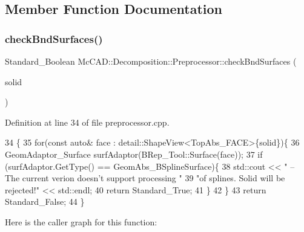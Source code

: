 \subsection{Member Function Documentation}
\mbox{\label{classMcCAD_1_1Decomposition_1_1Preprocessor_a1a473424ccfb217e9bce1730e1f8a0da}} 
\subsubsection{\texorpdfstring{check\+Bnd\+Surfaces()}{checkBndSurfaces()}\hspace{0.1cm}{\footnotesize\ttfamily [1/2]}}
{\footnotesize\ttfamily Standard\+\_\+\+Boolean Mc\+C\+A\+D\+::\+Decomposition\+::\+Preprocessor\+::check\+Bnd\+Surfaces (\begin{DoxyParamCaption}\item[{const Topo\+D\+S\+\_\+\+Solid \&}]{solid }\end{DoxyParamCaption})}



Definition at line 34 of file preprocessor.\+cpp.


\begin{DoxyCode}
34                                                                          \{
35     \textcolor{keywordflow}{for}(\textcolor{keyword}{const} \textcolor{keyword}{auto}& face : detail::ShapeView<TopAbs\_FACE>\{solid\})\{
36         GeomAdaptor\_Surface surfAdaptor(BRep\_Tool::Surface(face));
37         \textcolor{keywordflow}{if} (surfAdaptor.GetType() == GeomAbs\_BSplineSurface)\{
38             std::cout << \textcolor{stringliteral}{"    -- The current verion doesn't support processing "}
39                          \textcolor{stringliteral}{"of splines. Solid will be rejected!"} << std::endl;
40             \textcolor{keywordflow}{return} Standard\_True;
41         \}
42     \}
43     \textcolor{keywordflow}{return} Standard\_False;
44 \}
\end{DoxyCode}
Here is the caller graph for this function\+:
\mbox{\label{classMcCAD_1_1Decomposition_1_1Preprocessor_a1a473424ccfb217e9bce1730e1f8a0da}} 
